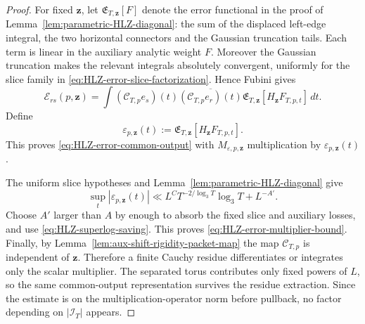 \begin{proof}
For fixed $\mathbf z$, let $\mathfrak E_{T,\mathbf z}[F]$ denote the error
functional in the proof of Lemma~\ref{lem:parametric-HLZ-diagonal}: the sum of
the displaced left-edge integral, the two horizontal connectors and the
Gaussian truncation tails.  Each term is linear in the auxiliary analytic
weight $F$.  Moreover the Gaussian truncation makes the relevant integrals
absolutely convergent, uniformly for the slice family in
\eqref{eq:HLZ-error-slice-factorization}.  Hence Fubini gives
\[
\mathcal E_{rs}(p,\mathbf z)
=\int
 (\mathscr C_{T,p}e_s)(t)
 \overline{(\mathscr C_{T,p}e_r)(t)}
 \mathfrak E_{T,\mathbf z}[H_{\mathbf z}F_{T,p,t}]\,dt.
\]
Define
\[
\varepsilon_{p,\mathbf z}(t)
:=\mathfrak E_{T,\mathbf z}[H_{\mathbf z}F_{T,p,t}].
\]
This proves \eqref{eq:HLZ-error-common-output} with
$M_{\varepsilon,p,\mathbf z}$ multiplication by
$\varepsilon_{p,\mathbf z}(t)$.

The uniform slice hypotheses and Lemma~\ref{lem:parametric-HLZ-diagonal} give
\[
\sup_t|\varepsilon_{p,\mathbf z}(t)|
\ll
L^C T^{-2/\log_3T}\log_3T+L^{-A'}.
\]
Choose $A'$ larger than $A$ by enough to absorb the fixed slice and auxiliary
losses, and use \eqref{eq:HLZ-superlog-saving}.  This proves
\eqref{eq:HLZ-error-multiplier-bound}.  Finally, by
Lemma~\ref{lem:aux-shift-rigidity-packet-map} the map $\mathscr C_{T,p}$ is
independent of $\mathbf z$.  Therefore a finite Cauchy residue differentiates
or integrates only the scalar multiplier.  The separated torus contributes
only fixed powers of $L$, so the same common-output representation survives the
residue extraction.  Since the estimate is on the multiplication-operator norm
before pullback, no factor depending on $|\mathcal I_T|$ appears.
\end{proof}

